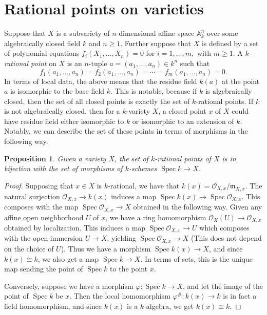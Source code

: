 \documentclass[12pt,twoside]{reedthesis}
\theoremstyle{plain}
\newtheorem{proposition}[theorem]{Proposition}
\theoremstyle{definition}
\theoremstyle{remark}
\newcommand{\Affine}{\mathbb{A}}
\newcommand{\calO}{\mathcal{O}}
\newcommand{\Spec}{\operatorname{Spec}}
\begin{document}
\section{Rational points on varieties}
Suppose that $X$ is a subvariety of $n$-dimensional affine space $\Affine^n_k$ over some algebraically closed field $k$ and $n\geq1$. Further suppose that $X$ is defined by a set of polynomial equations $f_i(X_1,\ldots,X_n)=0$ for $i=1,\ldots,m,$ with $m\geq1.$  A \emph{$k$-rational point} on $X$ is an $n$-tuple $a=(a_1,\ldots,a_n)\in k^n$ such that \[f_1(a_1,\ldots,a_n)=f_2(a_1,\ldots,a_n)=\cdots=f_m(a_1,\ldots,a_n)=0.\] 
In terms of local data, the above means that the residue field $k(a)$ at the point $a$ is isomorphic to the base field $k$. This is notable, because if $k$ is algebraically closed, then the set of all closed points is exactly the set of $k$-rational points. If $k$ is not algebraically closed, then for a $k$-variety $X$, a closed point $x$ of $X$ could have residue field either isomorphic to $k$ or isomorphic to an extension of $k$. 
Notably, we can describe the set of these points in terms of morphisms in the following way.
\begin{proposition}
Given a variety $X$, the set of $k$-rational points of $X$ is in bijection with the set of morphisms of $k$-schemes $\Spec k\to X$.
\end{proposition}
\begin{proof}
Supposing that $x\in X$ is $k$-rational, we have that $k(x)=\calO_{X,x}/\mathfrak{m}_{X,x}$. The natural surjection $\calO_{X,x}\to k(x)$ induces a map $\Spec k(x)\to\Spec\calO_{X,x}$. This composes with the map $\Spec\calO_{X,x}\to X$ obtained in the following way. Given any affine open neighborhood $U$ of $x$, we have a ring homomorphism $\calO_X(U)\to\calO_{X,x}$ obtained by localization. This induces a map $\Spec\calO_{X,x}\to U$ which composes with the open immersion $U\to X$, yielding $\Spec\calO_{X,x}\to X$ (This does not depend on the choice of $U$). Thus we have a morphism $\Spec k(x)\to X$, and since $k(x)\cong k$, we also get a map $\Spec k\to X$. In terms of sets, this is the unique map sending the point of $\Spec k$ to the point $x$.

Conversely, suppose we have a morphism $\varphi:\Spec k\to X$, and let the image of the point of $\Spec k$ be $x$. Then the local homomorphism $\varphi^\#: k(x)\to k$ is in fact a field homomorphism, and since $k(x)$ is a $k$-algebra, we get $k(x)\cong k$.
\end{proof}
\end{document}
